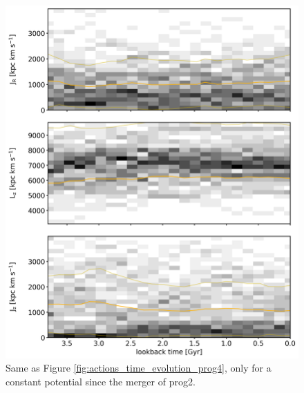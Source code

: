 \begin{figure}[htbp]
\captionsetup{format=plain}
    \centering
	\includegraphics[width=\textwidth]{plots/Dynamics/mean_pot/action_time_evolution_hist_mean_prog4.png}
    \caption{Same as Figure \ref{fig:actions_time_evolution_prog4}, only for a constant potential since the merger of prog2.}\label{fig:actions_time_evolution_mean_pot_prog4}
\end{figure}
\fi

